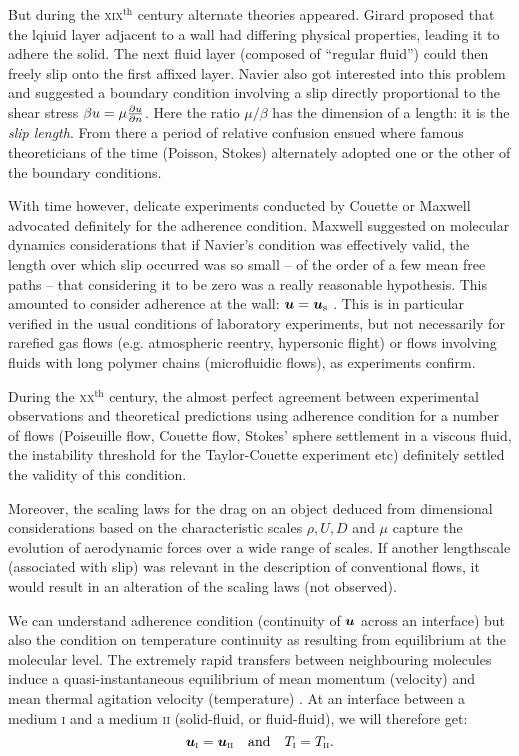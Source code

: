 But during the \textsc{xix}$^\text{th}$ century alternate theories appeared. Girard proposed that the lqiuid layer adjacent to a wall had differing physical properties, leading it to adhere the solid. The next fluid layer (composed of ``regular fluid'') could then freely slip onto the first affixed layer. Navier also got interested into this problem and suggested a boundary condition involving a slip directly proportional to the shear stress $\beta u = \mu \frac{\partial u}{\partial n}$. Here the ratio $\mu/\beta$ has the dimension of a length: it is the \textit{slip length}. From there a period of relative confusion ensued where famous theoreticians of the time (Poisson, Stokes) alternately adopted one or the other of the boundary conditions.

With time however, delicate experiments conducted by Couette or Maxwell advocated definitely for the adherence condition. Maxwell suggested on molecular dynamics considerations that if Navier's condition was effectively valid, the length over which slip occurred was so small -- of the order of a few mean free paths -- that considering it to be zero was a really reasonable hypothesis. This amounted to consider adherence at the wall: $\bu = \bu_\text s$ \citep{Maxwell1879}. This is in particular verified in the usual conditions of laboratory experiments, but not necessarily for rarefied gas flows (e.g. atmospheric reentry, hypersonic flight) or flows involving fluids with long polymer chains (microfluidic flows), as experiments confirm.

During the \textsc{xx}$^\text{th}$ century, the almost perfect agreement between experimental observations and theoretical predictions using adherence condition for a number of flows (Poiseuille flow, Couette flow, Stokes' sphere settlement in a viscous fluid, the instability threshold for the Taylor-Couette experiment etc) definitely settled the validity of this condition.

Moreover, the scaling laws for the drag on an object deduced from dimensional considerations based on the characteristic scales $\rho, U, D$ and $\mu$ capture the evolution of aerodynamic forces over a wide range of scales. If another lengthscale (associated with slip) was relevant in the description of conventional flows, it would result in an alteration of the scaling laws (not observed).

We can understand adherence condition (continuity of $\bu$ across an interface) but also the condition on temperature continuity as resulting from equilibrium at the molecular level. The extremely rapid transfers between neighbouring molecules induce a quasi-instantaneous equilibrium of mean momentum (velocity) and mean thermal agitation velocity (temperature) \citep{Batchelor1967}. At an interface between a medium \textsc{i} and a medium \textsc{ii} (solid-fluid, or fluid-fluid), we will therefore get:
\begin{equation}
\bu_\text{\textsc{i}} = \bu_\text{\textsc{ii}} \quad \text{and} \quad T_\text{\textsc{i}} = T_\text{\textsc{ii}}.
\end{equation}
